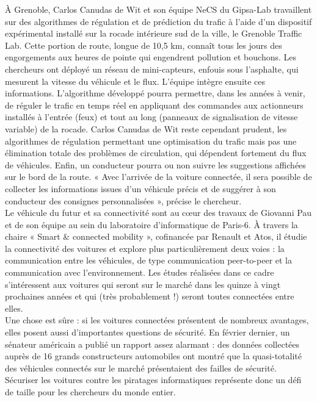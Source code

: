 \documentclass[8pt]{article}
\begin{document}
À Grenoble, Carlos Canudas de Wit et son équipe NeCS du Gipsa-Lab travaillent sur des algorithmes de régulation et de prédiction du trafic à l’aide d’un dispositif expérimental installé sur la rocade intérieure sud de la ville, le Grenoble Traffic Lab. Cette portion de route, longue de 10,5 km, connaît tous les jours des engorgements aux heures de pointe qui engendrent pollution et bouchons. Les chercheurs ont déployé un réseau de mini-capteurs, enfouis sous l’asphalte, qui mesurent la vitesse du véhicule et le flux. L’équipe intègre ensuite ces informations. L’algorithme développé pourra permettre, dans les années à venir, de réguler le trafic en temps réel en appliquant des commandes aux actionneurs installés à l’entrée (feux) et tout au long (panneaux de signalisation de vitesse variable) de la rocade. Carlos Canudas de Wit reste cependant prudent, les algorithmes de régulation permettant une optimisation du trafic mais pas une élimination totale des problèmes de circulation, qui dépendent fortement du flux de véhicules. Enfin, un conducteur pourra ou non suivre les suggestions affichées sur le bord de la route. « Avec l’arrivée de la voiture connectée, il sera possible de collecter les informations issues d’un véhicule précis et de suggérer à son conducteur des consignes personnalisées », précise le chercheur.\\


Le véhicule du futur et sa connectivité sont au cœur des travaux de Giovanni Pau et de son équipe au sein du laboratoire d’informatique de Paris-6. À travers la chaire « Smart \& connected mobility », cofinancée par Renault et Atos, il étudie la connectivité des voitures et explore plus particulièrement deux voies : la communication entre les véhicules, de type communication peer-to-peer et la communication avec l’environnement. Les études réalisées dans ce cadre s’intéressent aux voitures qui seront sur le marché dans les quinze à vingt prochaines années et qui (très probablement !) seront toutes connectées entre elles.\\

Une chose est sûre : si les voitures connectées présentent de nombreux avantages, elles posent aussi d’importantes questions de sécurité. En février dernier, un sénateur américain a publié un rapport assez alarmant : des données collectées auprès de 16 grands constructeurs automobiles ont montré que la quasi-totalité des véhicules connectés sur le marché présentaient des failles de sécurité. Sécuriser les voitures contre les piratages informatiques représente donc un défi de taille pour les chercheurs du monde entier.
\end{document}
